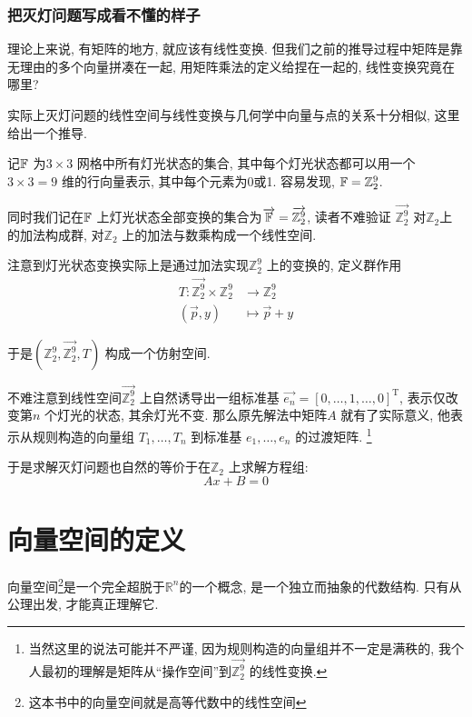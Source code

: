 \subsubsection{把灭灯问题写成看不懂的样子}

理论上来说, 有矩阵的地方, 就应该有线性变换. 但我们之前的推导过程中矩阵是靠无理由的多个向量拼凑在一起,
用矩阵乘法的定义给捏在一起的, 线性变换究竟在哪里?

实际上灭灯问题的线性空间与线性变换与几何学中向量与点的关系十分相似, 这里给出一个推导.

记\(\mathbb{F}\) 为\(3 \times 3\) 网格中所有灯光状态的集合,
其中每个灯光状态都可以用一个\(3 \times 3=9\) 维的行向量表示, 其中每个元素为0或1. 容易发现,
\(\mathbb{F}=\mathbb{Z}_{2}^{9}\).

同时我们记在\(\mathbb{F}\)
上灯光状态全部变换的集合为\(\overrightarrow{\mathbb{F}}=\overrightarrow{\mathbb{Z}_{2}^{9}}\),
读者不难验证 \(\overrightarrow{\mathbb{Z}_{2}^{9}}\)
对\(\mathbb{Z}_{2}\)上的加法构成群, 对\(\mathbb{Z}_{2}\) 上的加法与数乘构成一个线性空间.

注意到灯光状态变换实际上是通过加法实现\(\mathbb{Z}^{9}_{2}\) 上的变换的, 定义群作用
\begin{align*}
    T: \overrightarrow{\mathbb{Z}_{2}^{9}} \times
    \mathbb{Z}_{2}^{9} &\to \mathbb{Z}_{2}^{9}\\
    (\vec{p},y) &\mapsto \vec{p}+y
\end{align*}

于是\((\mathbb{Z}^{9}_{2},
\overrightarrow{\mathbb{Z}^{9}_{2}}, T)\) 构成一个仿射空间.

不难注意到线性空间\(\overrightarrow{\mathbb{Z}^{9}_{2}}\) 上自然诱导出一组标准基
\(\vec{e_{n}}=[0,\dots,1,\dots,0]^{\mathrm{T}}\),
表示仅改变第\(n\) 个灯光的状态, 其余灯光不变.  那么原先解法中矩阵\(A\) 就有了实际意义, 他表示从规则构造的向量组
\({T_{1}, \dots, T_{n}}\) 到标准基 \({e_{1}, \dots, e_{n}}\) 的过渡矩阵.
\footnote{当然这里的说法可能并不严谨, 因为规则构造的向量组并不一定是满秩的,
我个人最初的理解是矩阵从``操作空间''到\(\overrightarrow{\mathbb{Z}^{9}_{2}}\) 的线性变换.}

于是求解灭灯问题也自然的等价于在\(\mathbb{Z}_{2}\) 上求解方程组:
\[
    Ax+B=0
\]

\section{向量空间的定义}
向量空间\footnote{这本书中的向量空间就是高等代数中的线性空间}是一个完全超脱于\(\mathbb{R}^{n}\)的一个概念,
是一个独立而抽象的代数结构. 只有从公理出发, 才能真正理解它.


